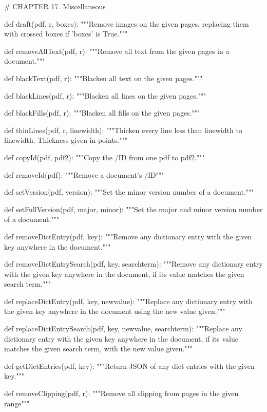# CHAPTER 17. Miscellaneous

def draft(pdf, r, boxes):
    """Remove images on the given pages, replacing
    them with crossed boxes if 'boxes' is True."""

def removeAllText(pdf, r):
    """Remove all text from the given pages in a document."""

def blackText(pdf, r):
    """Blacken all text on the given pages."""

def blackLines(pdf, r):
    """Blacken all lines on the given pages."""

def blackFills(pdf, r):
    """Blacken all fills on the given pages."""

def thinLines(pdf, r, linewidth):
    """Thicken every line less than
    linewidth to linewidth. Thickness given in points."""

def copyId(pdf, pdf2):
    """Copy the /ID from one pdf to pdf2."""

def removeId(pdf):
    """Remove a document's /ID"""

def setVersion(pdf, version):
    """Set the minor version number of a document."""

def setFullVersion(pdf, major, minor):
    """Set the major and minor version number of
    a document."""

def removeDictEntry(pdf, key):
    """Remove any dictionary entry with the given
    key anywhere in the document."""

def removeDictEntrySearch(pdf, key, searchterm):
    """Remove any dictionary entry with the given
    key anywhere in the document, if its value matches the given search term."""

def replaceDictEntry(pdf, key, newvalue):
    """Replace any dictionary entry with the given
    key anywhere in the document using the new value given."""

def replaceDictEntrySearch(pdf, key, newvalue, searchterm):
    """Replace any dictionary entry with the given key anywhere in the
    document, if its value matches the given search term, with the new value
    given."""

def getDictEntries(pdf, key):
    """Return JSON of any dict entries with the given key."""

def removeClipping(pdf, r):
    """Remove all clipping from pages in the given range"""
